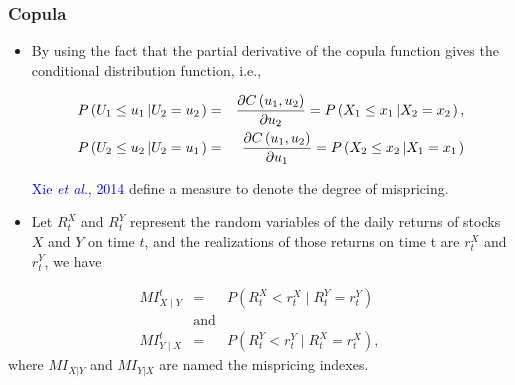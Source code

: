 \documentclass[pdf,9pt,xcolor=dvipsnames,hide notes]{beamer}
\begin{document}
\begin{frame}[label=frame4e]
	\frametitle{Copula}
	
	\begin{itemize}
			\item By using the fact that the partial derivative of the copula function gives the conditional distribution function, i.e., 
			
			\begin{eqnarray*}
				P\left( U_{1}\leq u_{1}\left\vert U_{2}=u_{2}\right. \right)  &=&\frac{%
					\partial C\left( u_{1},u_{2}\right) }{\partial u_{2}}=P\left( X_{1}\leq
				x_{1}\left\vert X_{2}=x_{2}\right. \right) , \\
				P\left( U_{2}\leq u_{2}\left\vert U_{2}=u_{1}\right. \right)  &=&\frac{%
					\partial C\left( u_{1},u_{2}\right) }{\partial u_{1}}=P\left( X_{2}\leq
				x_{2}\left\vert X_{1}=x_{1}\right. \right) 
			\end{eqnarray*}
		
		\vspace{0.3cm}
			
			 \textcolor{blue}{Xie \emph{et al}}., \textcolor{blue}{2014} define a measure to denote the degree of mispricing.
	
\end{itemize}

\vspace{0.3cm}
		\begin{definition}
		\begin{itemize}
			\item Let $R_{t}^{X}$ and $R_{t}^{Y}$ represent the random variables of the daily returns of stocks $X$ and $Y$ on time $t$, and
			the realizations of those returns on time t are $r_{t}^{X}$ and $r_{t}^{Y}$, we have
		\end{itemize}
		\begin{eqnarray*}
			MI_{X\mid Y}^{t} & = & P(R_{t}^{X}<r_{t}^{X}\mid R_{t}^{Y}=r_{t}^{Y}) \\
			& \text{and}  & \\
			MI_{Y\mid X}^{t} & = & P(R_{t}^{Y}<r_{t}^{Y}\mid R_{t}^{X}=r_{t}^{X}),
		\end{eqnarray*}
		where $MI_{X|Y}$ and $MI_{Y|X}$ are named the mispricing indexes.
	\end{definition}
\end{frame}
\end{document}
